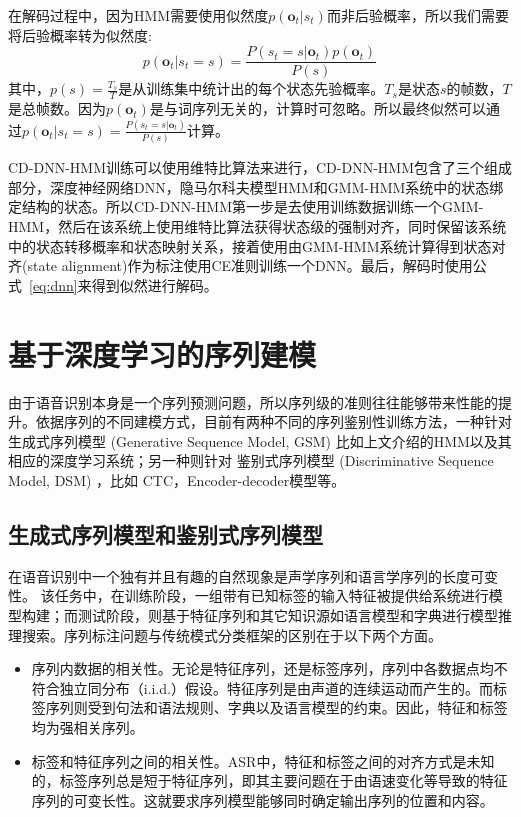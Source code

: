 在解码过程中，因为HMM需要使用似然度$p(\mathbf{o}_t|s_t)$而非后验概率，所以我们需要将后验概率转为似然度:
\begin{equation}
    \label{eq:dnn}
    p(\mathbf{o}_t|s_t=s) = \frac{P(s_t=s|\mathbf{o}_t)p(\mathbf{o}_t)}{P(s)}
\end{equation}
其中，$p(s)=\frac{T_s}{T}$是从训练集中统计出的每个状态先验概率。$T_s$是状态$s$的帧数，$T$是总帧数。因为$p(\mathbf{o}_t)$是与词序列无关的，计算时可忽略。所以最终似然可以通过$p(\mathbf{o}_t|s_t=s)=\frac{P(s_t=s|\mathbf{o}_t)}{P(s)}$计算。

CD-DNN-HMM训练可以使用维特比算法来进行，CD-DNN-HMM包含了三个组成部分，深度神经网络DNN，隐马尔科夫模型HMM和GMM-HMM系统中的状态绑定结构的状态。所以CD-DNN-HMM第一步是去使用训练数据训练一个GMM-HMM，然后在该系统上使用维特比算法获得状态级的强制对齐，同时保留该系统中的状态转移概率和状态映射关系，接着使用由GMM-HMM系统计算得到状态对齐(state alignment)作为标注使用CE准则训练一个DNN。最后，解码时使用公式~\ref{eq:dnn}来得到似然进行解码。



\section{基于深度学习的序列建模}
\label{Sec:seq-tr-review}

由于语音识别本身是一个序列预测问题，所以序列级的准则往往能够带来性能的提升。依据序列的不同建模方式，目前有两种不同的序列鉴别性训练方法，一种针对  生成式序列模型 (Generative Sequence Model, GSM) 比如上文介绍的HMM以及其相应的深度学习系统；另一种则针对 鉴别式序列模型 (Discriminative Sequence Model, DSM) ，比如 CTC，Encoder-decoder模型等。 



\subsection{生成式序列模型和鉴别式序列模型}
\label{Sec:sgm-and-sdm}
在语音识别中一个独有并且有趣的自然现象是声学序列和语言学序列的长度可变性。
该任务中，在训练阶段，一组带有已知标签的输入特征被提供给系统进行模型构建；而测试阶段，则基于特征序列和其它知识源如语言模型和字典进行模型推理搜索。序列标注问题与传统模式分类框架的区别在于以下两个方面。
\begin{itemize}
\item 序列内数据的相关性。无论是特征序列，还是标签序列，序列中各数据点均不符合独立同分布（i.i.d.）假设。特征序列是由声道的连续运动而产生的。而标签序列则受到句法和语法规则、字典以及语言模型的约束。因此，特征和标签均为强相关序列。

\item 标签和特征序列之间的相关性。ASR中，特征和标签之间的对齐方式是未知的，标签序列总是短于特征序列，即其主要问题在于由语速变化等导致的特征序列的可变长性。这就要求序列模型能够同时确定输出序列的位置和内容。
\end{itemize}

